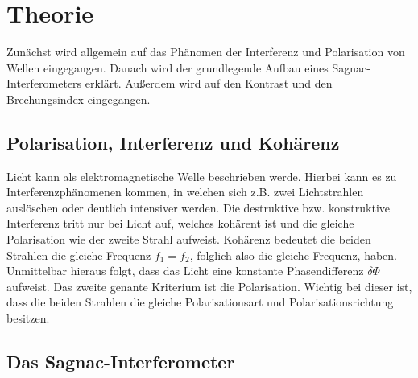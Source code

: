 \section{Theorie}
\label{sec:Theorie}

Zunächst wird allgemein auf das Phänomen der Interferenz und Polarisation von Wellen eingegangen.
Danach wird der grundlegende Aufbau eines Sagnac-Interferometers erklärt.
Außerdem wird auf den Kontrast und den Brechungsindex eingegangen.

\subsection{Polarisation, Interferenz und Kohärenz}
\label{sec:polarisation}
Licht kann als elektromagnetische Welle beschrieben werde. Hierbei kann es zu Interferenzphänomenen kommen, in welchen sich z.B. zwei Lichtstrahlen auslöschen oder deutlich intensiver werden.
Die destruktive bzw. konstruktive Interferenz tritt nur bei Licht auf, welches kohärent ist und die gleiche Polarisation wie der zweite Strahl aufweist.
Kohärenz bedeutet die beiden Strahlen die gleiche Frequenz $f_1=f_2$, folglich also die gleiche Frequenz, haben. Unmittelbar hieraus folgt, dass das Licht eine konstante Phasendifferenz $\delta \Phi$ aufweist.
Das zweite genante Kriterium ist die Polarisation. Wichtig bei dieser ist, dass die beiden Strahlen die gleiche Polarisationsart und Polarisationsrichtung besitzen.


\subsection{Das Sagnac-Interferometer} 
\label{sec:aufbau}


